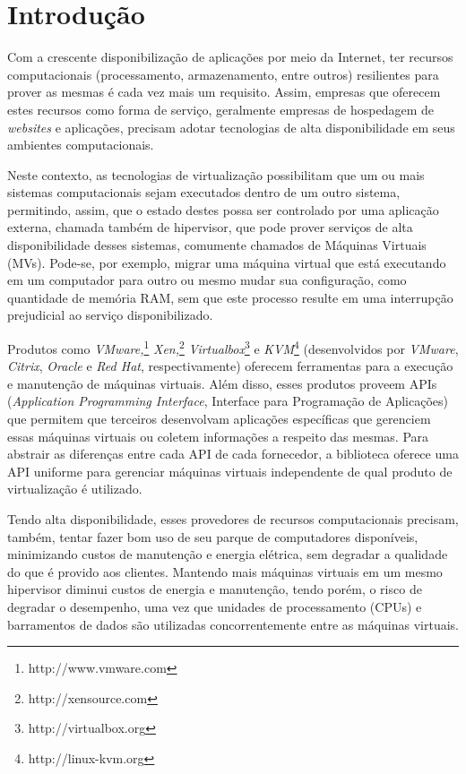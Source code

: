 %
%

\chapter{Introdução}

Com a crescente disponibilização de aplicações por meio da Internet, ter
recursos computacionais (processamento, armazenamento, entre outros)
resilientes para prover as mesmas é cada vez mais um requisito. Assim,
empresas que oferecem estes recursos como forma de serviço, geralmente
empresas de hospedagem de \emph{websites} e aplicações, precisam adotar
tecnologias de alta disponibilidade em seus ambientes computacionais.

Neste contexto, as tecnologias de virtualização possibilitam que um ou mais
sistemas computacionais sejam executados dentro de um outro sistema,
permitindo, assim, que o estado destes possa ser controlado por uma aplicação
externa, chamada também de hipervisor, que pode prover serviços de
alta disponibilidade desses sistemas, comumente chamados de Máquinas
Virtuais (MVs). Pode-se, por exemplo, migrar uma máquina virtual que está
executando em um computador para outro ou mesmo mudar sua configuração,
como quantidade de memória RAM, sem que este processo resulte em uma
interrupção prejudicial ao serviço disponibilizado.

Produtos como \emph{VMware,}\footnote{http://www.vmware.com}
\emph{Xen,}\footnote{http://xensource.com}
\emph{Virtualbox}\footnote{http://virtualbox.org} e
\emph{KVM}\footnote{http://linux-kvm.org} (desenvolvidos por
\emph{VMware}, \emph{Citrix}, \emph{Oracle} e \emph{Red Hat},
respectivamente) oferecem ferramentas para a
execução e manutenção de máquinas virtuais. Além disso, esses produtos
proveem APIs (\emph{Application Programming Interface}, Interface para Programação
de Aplicações) que permitem que terceiros desenvolvam aplicações
específicas que gerenciem essas máquinas virtuais ou coletem informações a
respeito das mesmas. Para abstrair as diferenças entre cada API de cada
fornecedor, a biblioteca \libvirt{} oferece uma API uniforme para gerenciar
máquinas virtuais independente de qual produto de virtualização é
utilizado.

Tendo alta disponibilidade, esses provedores de recursos computacionais
precisam, também, tentar fazer bom uso de seu parque de computadores
disponíveis, minimizando custos de manutenção e energia elétrica,
sem degradar a qualidade do que é provido aos clientes. Mantendo mais
máquinas virtuais em um mesmo hipervisor diminui custos de energia e
manutenção, tendo porém, o risco de degradar o desempenho, uma vez que
unidades de processamento (CPUs) e barramentos de dados são utilizadas
concorrentemente entre as máquinas virtuais.

